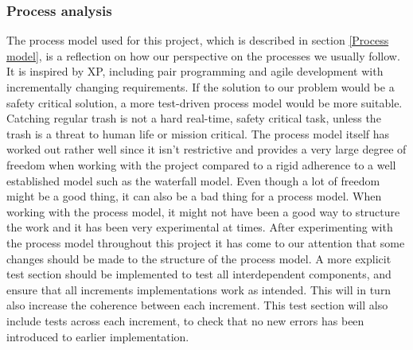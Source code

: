 \subsubsection{Process analysis}
The process model used for this project, which is described in section \ref{Process model}, is a reflection on how our perspective on the processes we usually follow. It is inspired by XP, including pair programming and agile development with incrementally changing requirements. If the solution to our problem would be a safety critical solution, a more test-driven process model would be more suitable. Catching regular trash is not a hard real-time, safety critical task, unless the trash is a threat to human life or mission critical.\newline
The process model itself has worked out rather well since it isn’t restrictive and provides a very large degree of freedom when working with the project compared to a rigid adherence to a well established model such as the waterfall model. \newline
Even though a lot of freedom might be a good thing, it can also be a bad thing for a process model. When working with the process model, it might not have been a good way to structure the work and it has been very experimental at times. \newline
After experimenting with the process model throughout this project it has come to our attention that some changes should be made to the structure of the process model. A more explicit test section should be implemented to test all interdependent components, and ensure that all increments implementations work as intended. This will in turn also increase the coherence between each increment. This test section will also include tests across each increment, to check that no new errors has been introduced to earlier implementation.


